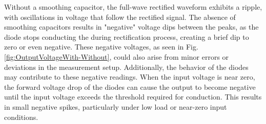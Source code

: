 Without a smoothing capacitor, the full-wave rectified waveform exhibits a ripple, with oscillations in voltage that follow the rectified signal. The absence of smoothing capacitors results in "negative" voltage dips between the peaks, as the diode stops conducting the during rectification process, creating a brief dip to zero or even negative. These negative voltages, as seen in Fig. \ref{fig:OutputVoltageWith-Without}, could also arise from minor errors or deviations in the measurement setup. Additionally, the behavior of the diodes may contribute to these negative readings. When the input voltage is near zero, the forward voltage drop of the diodes can cause the output to become negative until the input voltage exceeds the threshold required for conduction. This results in small negative spikes, particularly under low load or near-zero input conditions.

